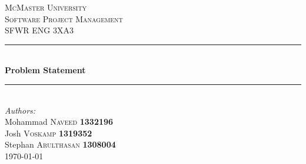 \documentclass[12pt]{article}
\begin{document}
	\sloppy
	
	\begin{titlepage}
		\color{red}
		\newcommand{\HRule}{\rule{\linewidth}{0.5mm}} %
		
		\center %
		
		
		\textsc{\LARGE McMaster University}\\[1.5cm] %
		\textsc{\Large Software Project Management}\\[0.5cm] %
		\textsc{\large SFWR ENG 3XA3}\\[0.5cm] %
		
		
		\HRule \\[0.4cm]
		{ \huge \bfseries Problem Statement}\\[0.4cm] %
		\HRule \\[1.5cm]
		
		
		
		
		\Large \emph{Authors:}\\
		Mohammad \textsc{Naveed} \textbf{1332196} \\ %
		Josh \textsc{Voskamp} \textbf{1319352} \\
		Stephan \textsc{Arulthasan} \textbf{1308004} \\[3cm]
		
		{\large \today}\\[3cm] %
		

\end{titlepage}
\end{document}
